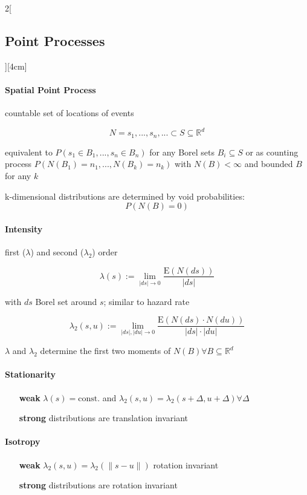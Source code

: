 \documentclass[8pt]{extarticle}
\begin{document}
\begin{multicols}{2}[\subsection{Point Processes}][4cm] 

\paragraph{Spatial Point Process} countable set of locations of events

$$N={s_1,...,s_n, ...} \subset S \subseteq \mathbb{R}^d$$

\noindent equivalent to $P(s_1 \in B_1, ..., s_n \in B_n)$ for any Borel sets $B_i \subseteq S$ or as counting process $P(N(B_1)=n_1, ..., N(B_k)=n_k)$ with $N(B)<\infty$ and bounded $B$ for any $k$

\noindent k-dimensional distributions are determined by void probabilities:
$$P(N(B)=0)$$

\paragraph{Intensity} first ($\lambda$) and second ($\lambda_2$) order

$$\lambda(s):=\lim_{|ds|\rightarrow 0} \frac{\mathrm{E}(N(ds))}{|ds|}$$

\noindent with $ds$ Borel set around $s$; similar to hazard rate

$$\lambda_2(s,u):=\lim_{|ds|,|du|\rightarrow 0}\frac{\mathrm{E}(N(ds)\cdot N(du))}{|ds| \cdot |du|}$$

\noindent $\lambda$ and $\lambda_2$ determine the first two moments of $N(B) \forall B\subseteq\mathbb{R}^d$

\paragraph{Stationarity} 
\vspace{-0.5em}
\begin{itemize}[leftmargin=5em,itemsep=-0.5em]
\item[\textbf{weak}] $\lambda(s)=\text{const.}$ and $\lambda_2(s,u)=\lambda_2(s+\Delta,u+\Delta) \forall \Delta$
\item[\textbf{strong}] distributions are translation invariant
\end{itemize}

\paragraph{Isotropy}
\vspace{-0.5em}
\begin{itemize}[leftmargin=5em,itemsep=-0.5em]
\item[\textbf{weak}] $\lambda_2(s,u)=\lambda_2(\|s-u\|)$ rotation invariant
\item[\textbf{strong}] distributions are rotation invariant
\end{itemize}



\end{multicols}
\end{document}
